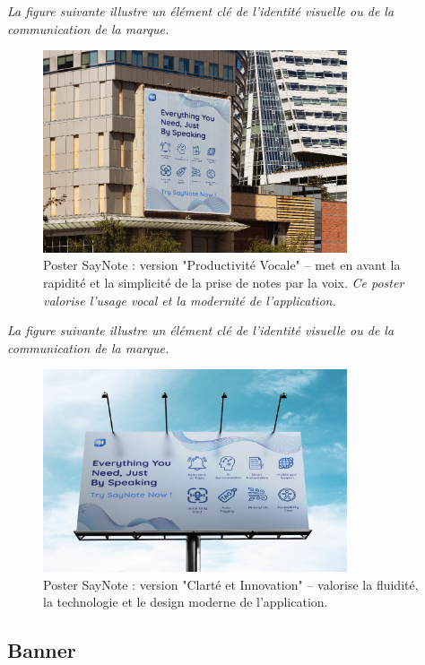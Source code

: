 \noindent
\textit{La figure suivante illustre un élément clé de l'identité visuelle ou de la communication de la marque.}
\begin{figure}[H]
    \centering
    \includegraphics[width=0.8\textwidth]{docs/visual-indentity/pictures/poster2.jpg}
    \caption{Poster SayNote : version "Productivité Vocale" – met en avant la rapidité et la simplicité de la prise de notes par la voix. \newline\textit{Ce poster valorise l'usage vocal et la modernité de l'application.}}
\end{figure}
\noindent
\textit{La figure suivante illustre un élément clé de l'identité visuelle ou de la communication de la marque.}
\begin{figure}[H]
    \centering
    \includegraphics[width=0.8\textwidth]{docs/visual-indentity/pictures/poster.jpg}
    \caption{Poster SayNote : version "Clarté et Innovation" – valorise la fluidité, la technologie et le design moderne de l’application.}
\end{figure}

\subsection{Banner}
